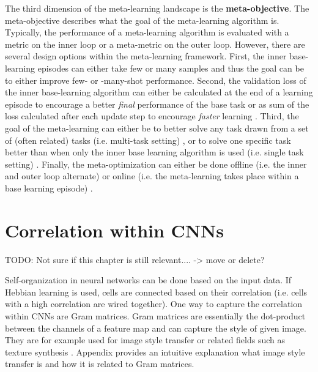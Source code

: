 The third dimension of the meta-learning landscape is the \textbf{meta-objective}.
The meta-objective describes what the goal of the meta-learning algorithm is.
Typically, the performance of a meta-learning algorithm is evaluated with a metric on the inner loop or a meta-metric on the outer loop.
However, there are several design options within the meta-learning framework.
First, the inner base-learning episodes can either take few \cite{ravi2016optimization, 10-5555-3305381-3305498} or many \cite{10-5555-3305381-3305502, 10-5555-3305890-3306069} samples and thus the goal can be to either improve few- or -many-shot performance.
Second, the validation loss of the inner base-learning algorithm can either be calculated at the end of a learning episode to encourage a better \emph{final} performance of the base task or as sum of the loss calculated after each update step to encourage \emph{faster} learning \cite{antoniou2018how}.
Third, the goal of the meta-learning can either be to better solve any task drawn from a set of (often related) tasks (i.e. multi-task setting) \cite{10-5555-3305381-3305498, 10-5555-3294996-3295163, li2019feature}, or to solve one specific task better than when only the inner base learning algorithm is used (i.e. single task setting) \cite{10-5555-3305381-3305502}.
Finally, the meta-optimization can either be done offline (i.e. the inner and outer loop alternate) \cite{10-5555-3305381-3305498} or online (i.e. the meta-learning takes place within a base learning episode) \cite{li2019feature}.


\section{Correlation within CNNs}

TODO: Not sure if this chapter is still relevant.... -> move or delete?

Self-organization in neural networks can be done based on the input data.
If Hebbian learning is used, cells are connected based on their correlation (i.e. cells with a high correlation are wired together).
One way to capture the correlation within CNNs are Gram matrices.
Gram matrices are essentially the dot-product between the channels of a feature map and can capture the style of given image.
They are for example used for image style transfer or related fields such as texture synthesis .
Appendix  provides an intuitive explanation what image style transfer is and how it is related to Gram matrices.

